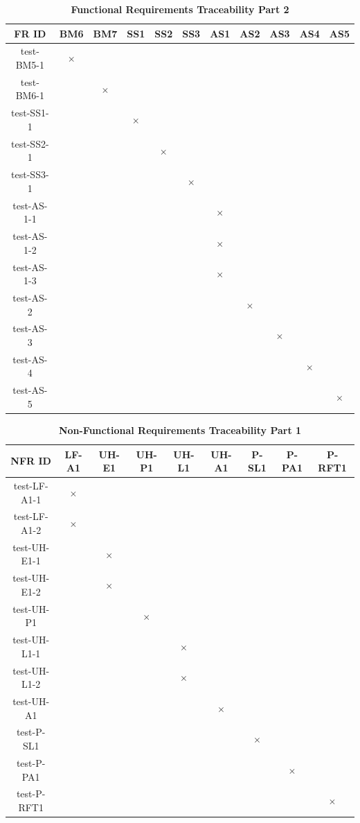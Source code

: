\documentclass[12pt, titlepage]{article}
\begin{document}
\begin{table}[H]
\centering
\begin{tabular}{|c|c c c c c c c c c c|}
\hline
FR ID & BM6 & BM7 & SS1 & SS2 & SS3 & AS1 & AS2 & AS3 & AS4 & AS5 \\
\hline 
test-BM5-1 & $\times$ & & & & & & & & & \\ \hline
test-BM6-1 & & $\times$ & & & & & & & & \\ \hline
test-SS1-1 & & & $\times$ & & & & & & & \\ \hline
test-SS2-1 & & & & $\times$ & & & & & & \\ \hline
test-SS3-1 & & & & & $\times$ & & & & & \\ \hline
test-AS-1-1 & & & & & &  $\times$ & & &  & \\ \hline
test-AS-1-2 & & & & & &  $\times$ & & &  & \\ \hline
test-AS-1-3 & & & & & &  $\times$ & & &  & \\ \hline
test-AS-2 & & & & & &   & $\times$ & &  & \\ \hline
test-AS-3 & & & & & & & & $\times$ &  & \\ \hline
test-AS-4 & & & & & & & & & $\times$ & \\ \hline
test-AS-5 & & & & & & & & & & $\times$ \\ \hline


\hline
\end{tabular}
\caption{\bf Functional Requirements Traceability Part 2}
\end{table}


\begin{table}[H]
\centering
\begin{tabular}{|c|c c c c c c c c|}
\hline
NFR ID & LF-A1 & UH-E1 & UH-P1 & UH-L1 & UH-A1 & P-SL1 & P-PA1 & P-RFT1 \\
\hline 
test-LF-A1-1 & $\times$ & & & & & & &   \\ \hline
test-LF-A1-2 & $\times$  & & & & & & &   \\ \hline
test-UH-E1-1 &  & $\times$  & & & & & &   \\ \hline
test-UH-E1-2 &  & $\times$  & & & & & &   \\ \hline
test-UH-P1 &  &  & $\times$  & & & & &   \\ \hline
test-UH-L1-1 &  & & & $\times$  & & & &   \\ \hline
test-UH-L1-2 &  & & & $\times$  & & & &   \\ \hline
test-UH-A1 &  &  & & & $\times$   & & &   \\ \hline 
test-P-SL1 &  &  & & &    & $\times$ & &   \\ \hline
test-P-PA1 &  &  & & &    &  & $\times$ &   \\ \hline
test-P-RFT1 &  &  & & &    &  &  & $\times$  \\
\hline
\end{tabular}
\caption{\bf Non-Functional Requirements Traceability Part 1}
\end{table}
\end{document}
